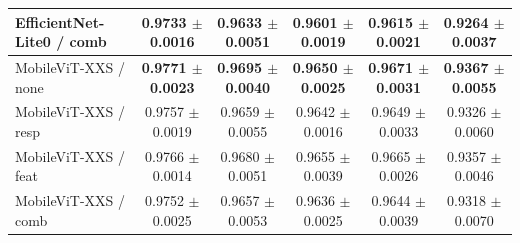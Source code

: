 \begin{table}[ht]
\begin{tabular}{lccccc}
EfficientNet-Lite0 / comb          & 0.9733 $\pm$ 0.0016      & 0.9633 $\pm$ 0.0051      & 0.9601 $\pm$ 0.0019      & 0.9615 $\pm$ 0.0021      & 0.9264 $\pm$ 0.0037      \\
\midrule
MobileViT-XXS / none               & \textbf{0.9771 $\pm$ 0.0023} & \textbf{0.9695 $\pm$ 0.0040} & \textbf{0.9650 $\pm$ 0.0025} & \textbf{0.9671 $\pm$ 0.0031} & \textbf{0.9367 $\pm$ 0.0055} \\
MobileViT-XXS / resp               & 0.9757 $\pm$ 0.0019      & 0.9659 $\pm$ 0.0055      & 0.9642 $\pm$ 0.0016      & 0.9649 $\pm$ 0.0033      & 0.9326 $\pm$ 0.0060      \\
MobileViT-XXS / feat               & 0.9766 $\pm$ 0.0014      & 0.9680 $\pm$ 0.0051      & 0.9655 $\pm$ 0.0039      & 0.9665 $\pm$ 0.0026      & 0.9357 $\pm$ 0.0046      \\
MobileViT-XXS / comb               & 0.9752 $\pm$ 0.0025      & 0.9657 $\pm$ 0.0053      & 0.9636 $\pm$ 0.0025      & 0.9644 $\pm$ 0.0039      & 0.9318 $\pm$ 0.0070      \\
\bottomrule
\end{tabular}
\end{table}
